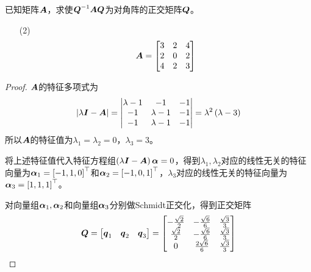 \begin{problem}
已知矩阵\(\boldsymbol{A}\)，求使\({\boldsymbol{Q}}^{-1}\boldsymbol{A}\boldsymbol{Q}\)为对角阵的正交矩阵\(\boldsymbol{Q}\)。
\begin{enumerate}
    \item[(2)]
          {
          \begin{equation*}
              \boldsymbol{A}=
              \begin{bmatrix}
                  3 & 2 & 4 \\
                  2 & 0 & 2 \\
                  4 & 2 & 3
              \end{bmatrix}
          \end{equation*}
          }
\end{enumerate}
\end{problem}
\begin{proof}
    \(\boldsymbol{A}\)的特征多项式为
    \begin{equation*}
        \left|\lambda\boldsymbol{I}-\boldsymbol{A} \right|=\begin{vmatrix}\lambda-1&-1&-1\\-1&\lambda-1&-1\\-1&\lambda-1&-1\end{vmatrix}=\lambda^2\left( \lambda-3 \right)
    \end{equation*}
    所以\(\boldsymbol{A}\)的特征值为\(\lambda_1=\lambda_2=0\)，\(\lambda_3=3\)。

    将上述特征值代入特征方程组\(\left( \lambda\boldsymbol{I}-\boldsymbol{A} \right)\boldsymbol{\alpha}=0\)，得到\(\lambda_1,\lambda_2\)对应的线性无关的特征向量为\(\boldsymbol{\alpha}_1=\left[ -1,1,0 \right]^\top\)和\(\boldsymbol{\alpha}_2=\left[ -1,0,1 \right]^\top\)，\(\lambda_3\)对应的线性无关的特征向量为\(\boldsymbol{\alpha}_3=\left[ 1,1,1 \right]^\top\)。

    对向量组\(\boldsymbol{\alpha}_1,\boldsymbol{\alpha}_2\)和向量组\(\boldsymbol{\alpha}_3\)分别做Schmidt正交化，得到正交矩阵
    \begin{equation*}
        \boldsymbol{Q}=\begin{bmatrix}\boldsymbol{q}_1&\boldsymbol{q}_2&\boldsymbol{q}_3\end{bmatrix}=
        \begin{bmatrix}
            -\frac{\sqrt{2}}{2} & -\frac{\sqrt{6}}{6} & \frac{\sqrt{3}}{3} \\
            \frac{\sqrt{2}}{2}  & -\frac{\sqrt{6}}{6} & \frac{\sqrt{3}}{3} \\
            0                   & \frac{2\sqrt{6}}{6} & \frac{\sqrt{3}}{3}
        \end{bmatrix}
    \end{equation*}
\end{proof}

